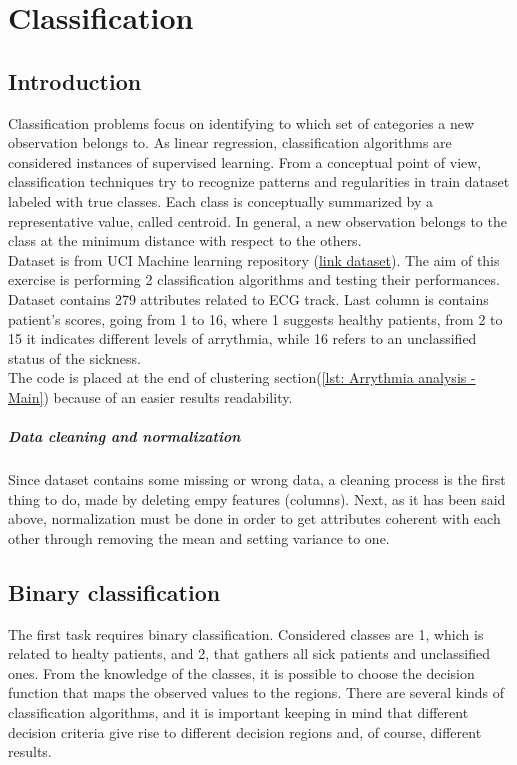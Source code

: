 \documentclass{article}
\begin{document}
\newpage
\section{Classification}
\subsection{Introduction}
Classification problems focus on identifying to which set of categories a new observation belongs to. As linear regression, classification algorithms are considered instances of supervised learning. From a conceptual point of view, classification techniques try to recognize patterns and regularities in train dataset labeled with true classes. Each class is conceptually summarized by a representative value, called centroid. In general, a new observation belongs to the class at the minimum distance with respect to the others.\\

Dataset is from UCI Machine learning repository (\href{http://archive.ics.uci.edu/ml/datasets/Arrhythmia}{link dataset}). The aim of this exercise is performing 2 classification algorithms and testing their performances. Dataset contains 279 attributes related to ECG track. Last column is contains patient's scores, going from 1 to 16, where 1 suggests healthy patients, from 2 to 15 it indicates different levels of arrythmia, while 16 refers to an unclassified status of the sickness. \\
The code is placed at the end of clustering section(\ref{lst: Arrythmia analysis - Main}) because of an easier results readability.

\subparagraph{Data cleaning and normalization}
Since dataset contains some missing or wrong data, a cleaning process is the first thing to do, made by deleting empy features (columns). Next, as it has been said above, normalization must be done in order to get attributes coherent with each other through removing the mean and setting variance to one. 

\subsection{Binary classification}
The first task requires binary classification. Considered classes are 1, which is related to healty patients, and 2, that gathers all sick patients and unclassified ones. From the knowledge of the classes, it is possible to choose the decision function that maps the observed values to the regions. There are several kinds of classification algorithms, and it is important keeping in mind that different decision criteria give rise to different decision regions and, of course, different results.
\end{document}
